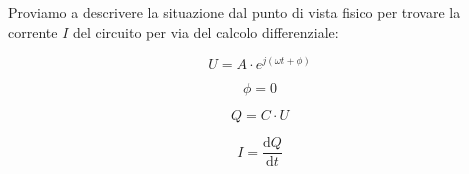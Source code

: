 \documentclass[a4paper, 10pt, final]{article} %
\begin{document}
    \noindent Proviamo a descrivere la situazione dal punto di vista fisico per trovare la corrente $I$ del circuito per via del calcolo differenziale:
    \begin{figure}[H]
        \centering
        \begin{minipage}[b]{.21\linewidth}
            \centering
            \begin{equation} \label{eqn:CapTrasferFunctionExample1}
                U = A \cdot e^{j \left( \omega t + \phi \right)}
            \end{equation}
        \end{minipage}
        \hspace{0.04\linewidth}
        \begin{minipage}[b]{.21\linewidth}
            \centering
            \begin{equation} \label{eqn:CapTrasferFunctionExample2}
                \phi = 0
            \end{equation}
        \end{minipage}
        \hspace{0.04\linewidth}
        \begin{minipage}[b]{.21\linewidth}
            \centering
            \begin{equation} \label{eqn:CapTrasferFunctionExample3}
                Q = C \cdot U
            \end{equation}
        \end{minipage}
        \hspace{0.04\linewidth}
        \begin{minipage}[b]{.21\linewidth}
            \centering
            \begin{equation} \label{eqn:CapTrasferFunctionExample4}
                I = \frac{\textrm{d}Q}{\textrm{d}t}
            \end{equation}
        \end{minipage}
    \end{figure}
\end{document}
